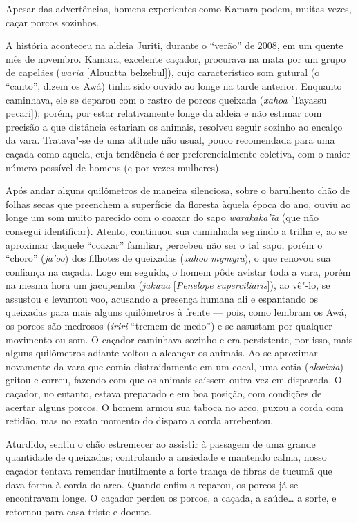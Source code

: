 Apesar das advertências, homens experientes como Kamara podem, muitas
vezes, caçar porcos sozinhos.

A história aconteceu na aldeia Juriti, durante o ``verão'' de 2008, em
um quente mês de novembro. Kamara, excelente caçador, procurava na mata
por um grupo de capelães (\emph{waria} {[}Alouatta belzebul{]}), cujo
característico som gutural (o ``canto'', dizem os Awá) tinha sido ouvido
ao longe na tarde anterior. Enquanto caminhava, ele se deparou com o
rastro de porcos queixada (\emph{xahoa} {[}Tayassu pecari{]}); porém,
por estar relativamente longe da aldeia e não estimar com precisão a que
distância estariam os animais, resolveu seguir sozinho ao encalço da
vara. Tratava"-se de uma atitude não usual, pouco recomendada para uma
caçada como aquela, cuja tendência é ser preferencialmente coletiva, com
o maior número possível de homens (e por vezes mulheres).

Após andar alguns quilômetros de maneira silenciosa, sobre o barulhento
chão de folhas secas que preenchem a superfície da floresta àquela época
do ano, ouviu ao longe um som muito parecido com o coaxar do sapo
\emph{warakaka'ĩa} (que não consegui identificar). Atento, continuou sua
caminhada seguindo a trilha e, ao se aproximar daquele ``coaxar''
familiar, percebeu não ser o tal sapo, porém o ``choro'' (\emph{ja'oo})
dos filhotes de queixadas (\emph{xahoo} \emph{mymyra}), o que renovou
sua confiança na caçada. Logo em seguida, o homem pôde avistar toda a
vara, porém na mesma hora um jacupemba (\emph{jakuua} {[}\emph{Penelope
superciliaris}{]}), ao vê"-lo, se assustou e levantou voo, acusando a
presença humana ali e espantando os queixadas para mais alguns
quilômetros à frente --- pois, como lembram os Awá, os porcos são medrosos
(\emph{iriri} ``tremem de medo'') e se assustam por qualquer movimento
ou som. O caçador caminhava sozinho e era persistente, por isso, mais
alguns quilômetros adiante voltou a alcançar os animais. Ao se aproximar
novamente da vara que comia distraidamente em um cocal, uma cotia
(\emph{akwixia}) gritou e correu, fazendo com que os animais saíssem
outra vez em disparada. O caçador, no entanto, estava preparado e em boa
posição, com condições de acertar alguns porcos. O homem armou sua
taboca no arco, puxou a corda com retidão, mas no exato momento do
disparo a corda arrebentou.

Aturdido, sentiu o chão estremecer ao assistir à passagem de uma grande
quantidade de queixadas; controlando a ansiedade e mantendo calma, nosso
caçador tentava remendar inutilmente a forte trança de fibras de tucumã
que dava forma à corda do arco. Quando enfim a reparou, os porcos já se
encontravam longe. O caçador perdeu os porcos, a caçada, a saúde\ldots{} a
sorte, e retornou para casa triste e doente.

